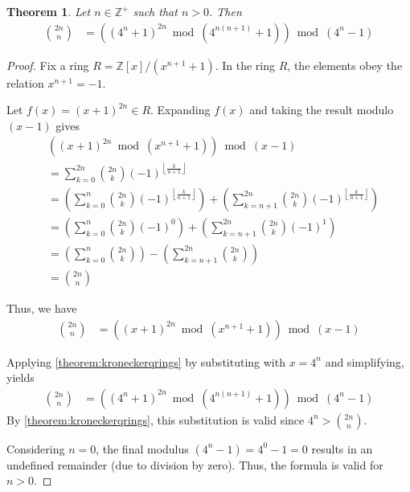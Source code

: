\documentclass[11pt,reqno]{article}
\theoremstyle{plain}
\newtheorem{theorem}{Theorem}
\theoremstyle{definition}
\newcommand{\floor}[1]{\left\lfloor #1 \right\rfloor}
\begin{document}
\begin{theorem} \label{theorem:cbc}
Let $n \in \mathbb{Z}^+$ such that $n > 0$. Then
\begin{align*}
\binom{2n}{n} &= \left((4^n + 1)^{2n} \bmod{(4^{n(n+1)} + 1)}\right) \bmod{(4^n-1)}
\end{align*}
\end{theorem}
\begin{proof}
Fix a ring $R = \mathbb{Z}[x]/(x^{n+1} + 1)$. In the ring $R$, the elements obey the relation $x^{n+1} = -1$.

Let $f(x) = (x + 1)^{2n} \in R$. Expanding $f(x)$ and taking the result modulo $(x-1)$ gives
\begin{align*}
& \left((x + 1)^{2n} \bmod{(x^{n+1} + 1)}\right) \bmod{(x-1)} \\
&= \sum_{k=0}^{2n} \binom{2n}{k} (-1)^{\floor{\frac{k}{n+1}}} \\
&= \left( \sum_{k=0}^{n} \binom{2n}{k} (-1)^{\floor{\frac{k}{n+1}}} \right) + \left( \sum_{k=n+1}^{2n} \binom{2n}{k} (-1)^{\floor{\frac{k}{n+1}}} \right) \\
&= \left( \sum_{k=0}^{n} \binom{2n}{k} (-1)^0 \right) + \left( \sum_{k=n+1}^{2n} \binom{2n}{k} (-1)^1 \right) \\
&= \left( \sum_{k=0}^{n} \binom{2n}{k} \right) - \left( \sum_{k=n+1}^{2n} \binom{2n}{k} \right) \\
&= \binom{2n}{n}
\end{align*}

Thus, we have
\begin{align*}
    \binom{2n}{n} &= \left((x + 1)^{2n} \bmod{(x^{n+1} + 1)}\right) \bmod{(x-1)}
\end{align*}

Applying \cref{theorem:kroneckerqrings} by substituting with $x = 4^n$ and simplifying, yields
\begin{align*}
    \binom{2n}{n} &= \left((4^n + 1)^{2n} \bmod{(4^{n(n+1)} + 1)}\right) \bmod{(4^n-1)}
\end{align*}
By \cref{theorem:kroneckerqrings}, this substitution is valid since $4^n > \binom{2n}{n}$.

Considering $n = 0$, the final modulus $(4^n-1) = 4^0-1 = 0$ results in an undefined remainder (due to division by zero). Thus, the formula is valid for $n > 0$.
\end{proof}
\end{document}

